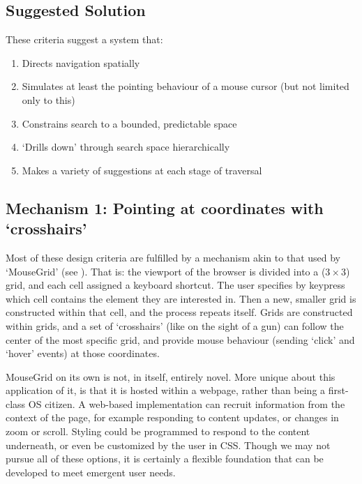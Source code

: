 \documentclass[11pt,openright,a4paper]{report}
\begin{document}
\subsection{Suggested Solution}
These criteria suggest a system that:

\newcommand{\designcriteria}{\begin{enumerate}
	\item Directs navigation spatially
	\item Simulates at least the pointing behaviour of a mouse cursor (but not limited only to this)
	\item Constrains search to a bounded, predictable space
	\item `Drills down' through search space hierarchically 
	\item Makes a variety of suggestions at each stage of traversal
\end{enumerate}}
\designcriteria

\subsection{Mechanism 1: Pointing at coordinates with `crosshairs'}
\label{sec:ourmousegrid}
Most of these design criteria are fulfilled by a mechanism akin to that used by `MouseGrid' (see ).
That is: the viewport of the browser is divided into a ($3\times3$) grid, and each cell assigned a keyboard shortcut. The user specifies by keypress which cell contains the element they are interested in. Then a new, smaller grid is constructed within that cell, and the process repeats itself.
Grids are constructed within grids, and a set of `crosshairs' (like on the sight of a gun) can follow the center of the most specific grid, and provide mouse behaviour (sending `click' and `hover' events) at those coordinates.

MouseGrid on its own is not, in itself, entirely novel. More unique about this application of it, is that it is hosted within a webpage, rather than being a first-class OS citizen. A web-based implementation can recruit information from the context of the page, for example responding to content updates, or changes in zoom or scroll. Styling could be programmed to respond to the content underneath, or even be customized by the user in CSS. Though we may not pursue all of these options, it is certainly a flexible foundation that can be developed to meet emergent user needs.
\end{document}
